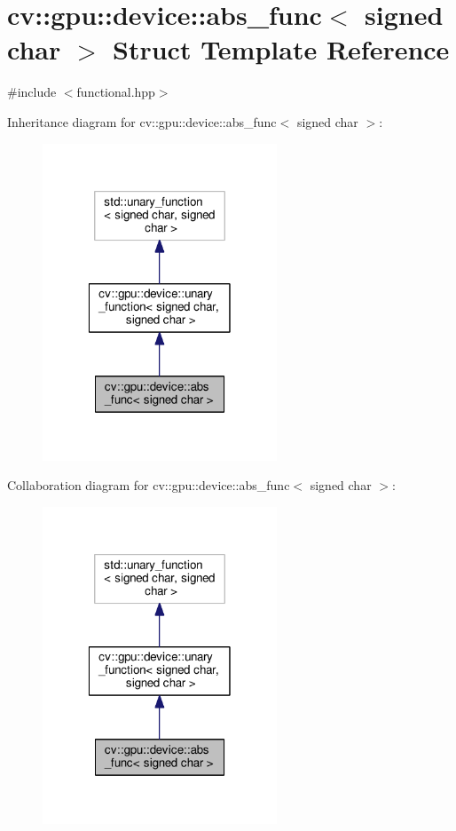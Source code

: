 \hypertarget{structcv_1_1gpu_1_1device_1_1abs__func_3_01signed_01char_01_4}{\section{cv\-:\-:gpu\-:\-:device\-:\-:abs\-\_\-func$<$ signed char $>$ Struct Template Reference}
\label{structcv_1_1gpu_1_1device_1_1abs__func_3_01signed_01char_01_4}
}


{\ttfamily \#include $<$functional.\-hpp$>$}



Inheritance diagram for cv\-:\-:gpu\-:\-:device\-:\-:abs\-\_\-func$<$ signed char $>$\-:\nopagebreak
\begin{figure}[H]
\begin{center}
\leavevmode
\includegraphics[width=198pt]{structcv_1_1gpu_1_1device_1_1abs__func_3_01signed_01char_01_4__inherit__graph}
\end{center}
\end{figure}


Collaboration diagram for cv\-:\-:gpu\-:\-:device\-:\-:abs\-\_\-func$<$ signed char $>$\-:\nopagebreak
\begin{figure}[H]
\begin{center}
\leavevmode
\includegraphics[width=198pt]{structcv_1_1gpu_1_1device_1_1abs__func_3_01signed_01char_01_4__coll__graph}
\end{center}
\end{figure}
